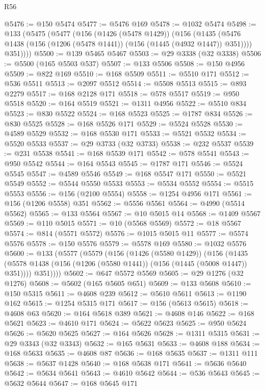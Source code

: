 \begin{lexlean}{R56}
\begin{coremodule}
{{{{{{{{{{{{{{{{{{{{{{{{{{{{{{{{{{{{{{{{{{{{{{{{{{{{{{{{{{{{{{{{{{{{{{{{{{{{{{{{{{{{{{{{{{{{{{{{{{{{{{{{{{{{{{{{{{{{{{{{{{{{{{{{{{{{{{{{{{{{{{{{{{{{{{{{{{{{{{{{{{{{{{{{{{{{{{{{{{{{{{{{{{{{{{{{{{{{{{{{{{{{{{{{{{{@5476 := @150 @5474
@5477 := @5476 @169
@5478 := @1032 @5474
@5498 := @133
    (@5475
      (@5477
        (@156
          (@1426 (@5478 @1429))
          (@156
            (@1435 (@5476 @1438 (@156 (@1206 (@5478 @1441)) (@156 (@1445 (@4932 @1447)) @351))))
            @351))))
@5500 := @139 @5465 @5467
@5503 := @29 @3338 (@32 @3338)
@5506 := @5500 (@165 @5503 @537)
@5507 := @133 @5506
@5508 := @150 @4956
@5509 := @822 @169
@5510 := @168 @5509
@5511 := @5510 @171
@5512 := @536 @5511
@5513 := @2097 @5512
@5514 := @5508 @5513
@5515 := @893 @2279
@5517 := @168 @2128 @171
@5518 := @578 @5517
@5519 := @950 @5518
@5520 := @164 @5519
@5521 := @1311 @4956
@5522 := @5510 @834
@5523 := @830 @5522
@5524 := @168 @5523
@5525 := @1787 @834
@5526 := @830 @5525
@5528 := @168 @5526 @171
@5529 := @5524 @5528
@5530 := @4589 @5529
@5532 := @168 @5530 @171
@5533 := @5521 @5532
@5534 := @5520 @5533
@5537 := @29 @3733 (@32 @3733)
@5538 := @232 @5537
@5539 := @231 @5538
@5541 := @168 @5539 @171
@5542 := @578 @5541
@5543 := @950 @5542
@5544 := @164 @5543
@5545 := @1787 @171
@5546 := @5524 @5545
@5547 := @4589 @5546
@5549 := @168 @5547 @171
@5550 := @5521 @5549
@5552 := @5544 @5550 @5533
@5553 := @5534 @5552
@5554 := @5515 @5553
@5556 := @156 (@2100 @5554)
@5558 := @1254 @4956 @171
@5561 := @156 (@1206 @5558) @351
@5562 := @5556 @5561
@5564 := @4990 (@5514 @5562)
@5565 := @133 @5564
@5567 := @10 @5015 @14
@5568 := @1409 @5567
@5569 := @110 @5015
@5571 := @10 (@5568 @5569)
@5572 := @18 @5567
@5574 := @814 (@5571 @5572)
@5576 := @1015 @5015 @11
@5577 := @5574 @5576
@5578 := @150 @5576
@5579 := @5578 @169
@5580 := @1032 @5576
@5600 := @133
    (@5577
      (@5579
        (@156
          (@1426 (@5580 @1429))
          (@156
            (@1435 (@5578 @1438 (@156 (@1206 (@5580 @1441)) (@156 (@1445 (@5008 @1447)) @351))))
            @351))))
@5602 := @647 @5572 @5569
@5605 := @29 @1276 (@32 @1276)
@5608 := @5602 (@165 @5605 @651)
@5609 := @133 @5608
@5610 := @150 @5315
@5611 := @4608 @239
@5612 := @5610 @5611
@5613 := @1190 @162
@5615 := @1254 @5315 @171
@5617 := @156 (@5613 @5615)
@5618 := @4608 @63
@5620 := @164 @5618 @389
@5621 := @4608 @146
@5622 := @168 @5621
@5623 := @4610 @171
@5624 := @5622 @5623
@5625 := @950 @5624
@5626 := @5620 @5625
@5627 := @164 @5626
@5628 := @1311 @5315
@5631 := @29 @3343 (@32 @3343)
@5632 := @165 @5631
@5633 := @4608 @188
@5634 := @168 @5633
@5635 := @4608 @87
@5636 := @168 @5635
@5637 := @1311 @111
@5638 := @5637 @1428
@5640 := @168 @5638 @171
@5641 := @5636 @5640
@5642 := @5634 @5641
@5643 := @4610 @5642
@5644 := @536 @5643
@5645 := @5632 @5644
@5647 := @168 @5645 @171
}}}}}}}}}}}}}}}}}}}}}}}}}}}}}}}}}}}}}}}}}}}}}}}}}}}}}}}}}}}}}}}}}}}}}}}}}}}}}}}}}}}}}}}}}}}}}}}}}}}}}}}}}}}}}}}}}}}}}}}}}}}}}}}}}}}}}}}}}}}}}}}}}}}}}}}}}}}}}}}}}}}}}}}}}}}}}}}}}}}}}}}}}}}}}}}}}}}}}}}}}}}}}}}}}}}
\end{coremodule}
\end{lexlean}
